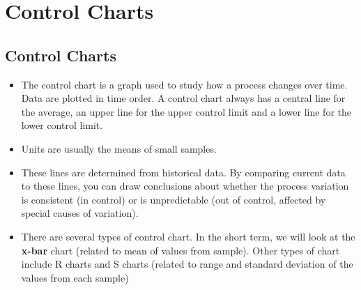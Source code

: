 \documentclass[]{article}
\title{}
\author{}
\begin{document}
\maketitle

\begin{abstract}

\end{abstract}
\tableofcontents
\newpage
\newpage
\section{Control Charts}
{
\large
}
\subsection{Control Charts}
{\large
\begin{itemize}
\item The control chart is a graph used to study how a process changes over time. Data are plotted in time order. A control chart always has a central line for the average, an upper line for the upper control limit and a lower line for the lower control limit. 
\item Units are usually the means of small samples.
\item These lines are determined from historical data. By comparing current data to these lines, you can draw conclusions about whether the process variation is consistent (in control) or is unpredictable (out of control, affected by special causes of variation).


\item There are several types of control chart. In the short term, we will look at the \textbf{x-bar} chart (related to mean of values from sample).
Other types of chart include R charts and S charts (related to range and standard deviation of the values from each sample)
\end{itemize}
}
\end{document}
